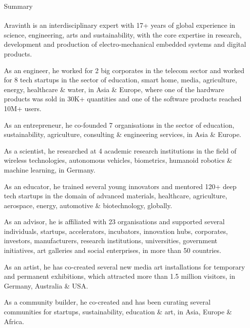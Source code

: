 \clearpage
\pagebreak
{
	\centering
	\Huge Summary
	\par
}

\paragraph{}
\Large
Aravinth is an interdisciplinary expert with 17+ years of global experience in science, engineering, arts and sustainability, with the core expertise in research, development and production of electro-mechanical embedded systems and digital products.

As an engineer, he worked for 2 big corporates in the telecom sector and worked for 8 tech startups in the sector of education, smart home, media, agriculture, energy, healthcare \& water, in Asia \& Europe, where one of the hardware products was sold in 30K+ quantities and one of the software products reached 10M+ users.

As an entrepreneur, he co-founded 7 organisations in the sector of education, sustainability, agriculture, consulting \& engineering services, in Asia \& Europe.

As a scientist, he researched at 4 academic research institutions in the field of wireless technologies, autonomous vehicles, biometrics, humanoid robotics \& machine learning, in Germany.

As an educator, he trained several young innovators and mentored 120+ deep tech startups in the domain of advanced materials, healthcare, agriculture, aerospace, energy, automotive \& biotechnology, globally.

As an advisor, he is affiliated with 23 organisations and supported several individuals, startups, accelerators, incubators, innovation hubs, corporates, investors, manufacturers, research institutions, universities, government initiatives, art galleries and social enterprises, in more than 50 countries.

As an artist, he has co-created several new media art installations for temporary and permanent exhibitions, which attracted more than 1.5 million visitors, in Germany, Australia \& USA.

As a community builder, he co-created and has been curating several communities for startups, sustainability, education \& art, in Asia, Europe \& Africa.

\clearpage

